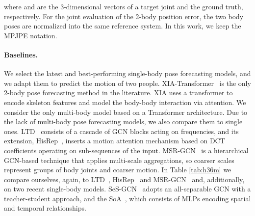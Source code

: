 \documentclass[10pt,twocolumn,letterpaper]{article}
\begin{document}
where  and  are the 3-dimensional vectors of a target joint and the ground truth, respectively.
For the joint evaluation of the 2-body position error, the two body poses are normalized into the same reference system. In this work, we keep the MPJPE notation. 

\paragraph{Baselines.} 
 We select the latest and best-performing single-body pose forecasting models, and we adapt them to predict the motion of two people.
XIA-Transformer~\cite{guo21} is the only 2-body pose forecasting method in the literature. XIA uses a transformer to encode skeleton features and model the body-body interaction via attention. We consider \cite{wang21} the only multi-body model based on a Transformer architecture.
Due to the lack of multi-body pose forecasting models, we also compare them to single ones. 
LTD~\cite{mao19ltd} consists of a cascade of GCN blocks acting on frequencies, and its extension, HisRep~\cite{mao20his}, inserts a motion attention mechanism based on DCT coefficients operating on sub-sequences of the input. 
MSR-GCN~\cite{Dang21} is a hierarchical GCN-based technique that applies multi-scale aggregations, so coarser scales represent groups of body joints and coarser motion. 
In Table \ref{tab:h36m} we compare ourselves, again,  to LTD~\cite{mao19ltd}, HisRep~\cite{mao20his} and MSR-GCN~\cite{Dang21} and, additionally, on two recent single-body models.
SeS-GCN~\cite{sampieri22} adopts an all-separable GCN with a teacher-student approach, and the SoA~\cite{guo2022back}, which consists of MLPs encoding spatial and temporal relationships. 
\end{document}
